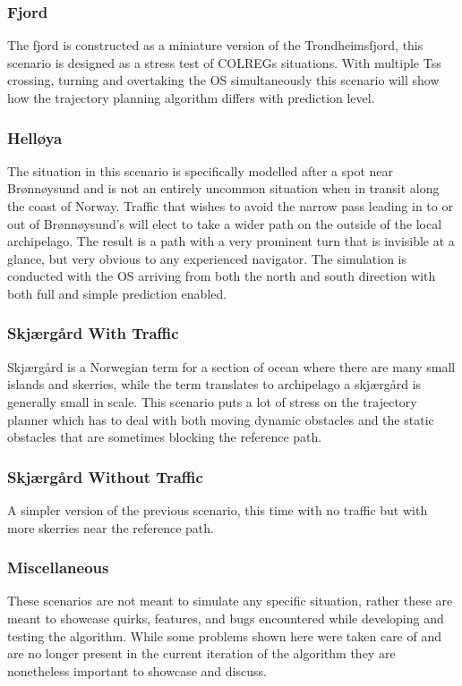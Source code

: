 \subsubsection*{Fjord}
The fjord is constructed as a miniature version of the Trondheimsfjord, this scenario is designed as a stress test of \gls{COLREGs} situations.
With multiple \gls{Ts}s crossing, turning and overtaking the \gls{OS} simultaneously this scenario will show how the trajectory planning algorithm
differs with prediction level.

\subsubsection*{Helløya}
The situation in this scenario is specifically modelled after a spot near Brønnøysund and is not an entirely uncommon
situation when in transit along the coast of Norway. Traffic that wishes to avoid the narrow pass leading in to or out of
Brønnøysund's will elect to take a wider path on the outside of the local archipelago. The result is a path with a very prominent
turn that is invisible at a glance, but very obvious to any experienced navigator. The simulation is conducted with the \gls{OS} arriving
from both the north and south direction with both full and simple prediction enabled. 

\subsubsection*{Skjærgård With Traffic}
Skjærgård is a Norwegian term for a section of ocean where there are many small islands and skerries, while the term translates to archipelago a skjærgård is generally small in scale.
This scenario puts a lot of stress on the trajectory planner which has to deal with both moving dynamic obstacles and the static obstacles that are sometimes blocking the reference path.

\subsubsection*{Skjærgård Without Traffic}
A simpler version of the previous scenario, this time with no traffic but with more skerries near the reference path.

\subsubsection*{Miscellaneous}
These scenarios are not meant to simulate any specific situation, rather these are meant to showcase quirks, features, and bugs
encountered while developing and testing the algorithm. While some problems shown here were taken care of and are no longer present in the
current iteration of the algorithm they are nonetheless important to showcase and discuss.


